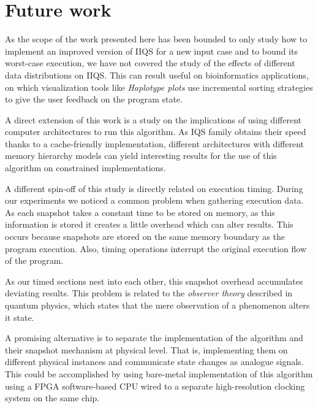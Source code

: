 \section{Future work}
As the scope of the work presented here has been bounded to only study how to implement an improved version of IIQS for a new input case and to bound its worst-case execution, we have not covered the study of the effects of different data distributions on IIQS. This can result useful on bioinformatics applications, on which visualization tools like \emph{Haplotype plots} use incremental sorting strategies to give the user feedback on the program state.

A direct extension of this work is a study on the implications of using different computer architectures to run this algorithm. As IQS family obtains their speed thanks to a cache-friendly implementation, different architectures with different memory hierarchy models can yield interesting results for the use of this algorithm on constrained implementations.

A different spin-off of this study is directly related on execution timing. During our experiments we noticed a common problem when gathering execution data. As each snapshot takes a constant time to be stored on memory, as this information is stored it creates a little overhead which can alter results. This occurs because snapshots are stored on the same memory boundary as the program execution. Also, timing operations interrupt the original execution flow of the program. 

As our timed sections nest into each other, this snapshot overhead accumulates deviating results. This problem is related to the \emph{observer theory} described in quantum physics, which states that the mere observation of a phenomenon alters it state. 

A promising alternative is to separate the implementation of the algorithm and their snapshot mechanism at physical level. That is, implementing them on different physical instances and communicate state changes as analogue signals. This could be accomplished by using bare-metal implementation of this algorithm using a FPGA software-based CPU wired to a separate high-resolution clocking system on the same chip.